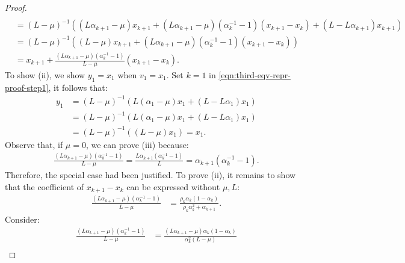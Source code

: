\documentclass[12pt]{article}
\begin{document}
\begin{proof}
{\begin{align*}
                \\
                &= (L - \mu)^{-1}
                \left(
                    (L\alpha_{k + 1} - \mu)x_{k + 1} + 
                    (L\alpha_{k + 1} - \mu)(\alpha_k^{-1} - 1)(x_{k + 1} - x_k)
                    + (L - L \alpha_{k + 1})x_{k + 1}
                \right)
                \\
                &= 
                (L - \mu)^{-1}
                \left(
                    (L - \mu)x_{k + 1} + (L\alpha_{k + 1} - \mu)(\alpha_k^{-1} - 1)(x_{k + 1} - x_k)
                \right)
                \\
                &= x_{k + 1} + \frac{(L\alpha_{k + 1} - \mu)(\alpha_k^{-1} - 1)}{L - \mu}(x_{k + 1} - x_k). 
            \end{align*}
            }
            To show (ii), we show $y_1 = x_1$ when $v_1 = x_1$. 
            Set $k = 1$ in \eqref{eqn:third-eqv-repr-proof-step1}, it follows that: 
            \begin{align*}
                y_1 &= (L - \mu)^{-1}(L(\alpha_1 - \mu)x_1 + (L - L\alpha_1)x_1)
                \\
                &= (L - \mu)^{-1}(L(\alpha_1 - \mu)x_1 + (L - L \alpha_1)x_1)
                \\
                &= (L - \mu)^{-1}((L - \mu)x_1) = x_1. 
            \end{align*}
            Observe that, if $\mu = 0$, we can prove (iii) because:
            \begin{align*}
                \frac{(L\alpha_{k + 1} - \mu)(\alpha_k^{-1} - 1)}{L - \mu} = 
                \frac{L\alpha_{k +1}(\alpha_k^{-1} - 1)}{L} = \alpha_{k +1}(\alpha_k^{-1} - 1). 
            \end{align*}
            Therefore, the special case had been justified. 
            To prove (ii), it remains to show that the coefficient of $x_{k + 1} - x_k$ can be expressed without $\mu, L$: 
            \begin{align*}
                \frac{(L\alpha_{k + 1} - \mu)(\alpha_k^{-1} - 1)}{L - \mu}
                &= \frac{\rho_k\alpha_k(1 - \alpha_k)}{\rho_k\alpha_k^2 + \alpha_{k + 1}}. 
            \end{align*}
            Consider: 
            \begin{align*}
                \frac{(L\alpha_{k + 1} - \mu)(\alpha_k^{-1} - 1)}{L - \mu}
                &= \frac{(L\alpha_{k + 1} - \mu)\alpha_k(1 - \alpha_k)}{\alpha_k^2(L - \mu)}
                \\

\end{align*}
\end{proof}
\end{document}
